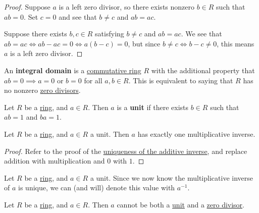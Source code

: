 \documentclass{scrartcl}
\begin{document}
\begin{proof}
    Suppose $a$ is a left zero divisor, so there exists nonzero $b\in R$ such that $ab=0$.
    Set $c=0$ and see that $b\neq c$ and $ab=ac$.

    Suppose there exists $b,c\in R$ satisfying $b\neq c$ and $ab=ac$.
    We see that $ab=ac\iff ab-ac=0\iff a(b-c)=0$, but since $b\neq c\iff b-c\neq 0$, this means $a$ is a left zero
    divisor.
\end{proof}

\begin{definition}
    An \textbf{integral domain} is a \hyperref[def:commutative ring]{commutative ring} $R$ with the additional property
    that $ab=0\implies a=0\text{ or }b=0$ for all $a,b\in R$.
    This is equivalent to saying that $R$ has no nonzero \hyperref[def:zero divisor]{zero divisors}.
\end{definition}

\begin{definition}[Unit]
    \label{def:unit}
    Let $R$ be a \hyperref[def:ring]{ring}, and $a\in R$.
    Then $a$ is a \textbf{unit} if there exists $b\in R$ such that $ab=1$ and $ba=1$.
\end{definition}

\begin{proposition}
    \label{prop:unique multiplicative inverse}
    Let $R$ be a \hyperref[def:ring]{ring}, and $a\in R$ a unit.
    Then $a$ has exactly one multiplicative inverse.
\end{proposition}

\begin{proof}
    Refer to the proof of the \hyperref[prop:unique additive inverse]{uniqueness of the additive inverse}, and replace
    addition with multiplication and $0$ with $1$.
\end{proof}

\begin{remark}
    Let $R$ be a \hyperref[def:ring]{ring}, and $a\in R$ a unit.
    Since we now know the multiplicative inverse of $a$ is unique, we can (and will) denote this value with $a^{-1}$.
\end{remark}

\begin{proposition}
    Let $R$ be a \hyperref[def:ring]{ring}, and $a\in R$.
    Then $a$ cannot be both a \hyperref[def:unit]{unit} and a \hyperref[def:zero divisor]{zero divisor}.
\end{proposition}
\end{document}
